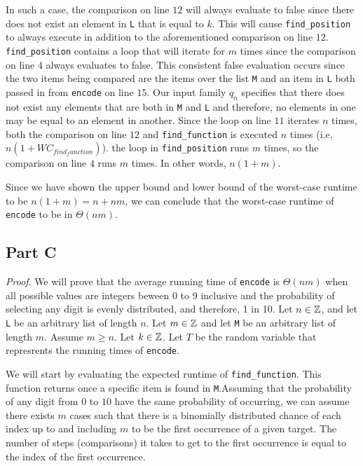 \documentclass{article}
\begin{document}
In such a case, the comparison on line $12$ will always evaluate to false since there does not exist an element in \verb|L| that is equal to $k$. This will cause \verb|find_position| to always execute in addition to the aforementioned comparison on line $12$. \verb|find_position| contains a loop that will iterate for $m$ times since the comparison on line $4$ always evaluates to false. This consistent false evaluation occurs since the two items being compared are the items over the list \verb|M| and an item in \verb|L| both passed in from \verb|encode| on line $15$. Our input family $q_n$ specifies that there does not exist any elements that are both in \verb|M| and \verb|L| and therefore, no elements in one may be equal to an element in another. Since the loop on line $11$ iterates $n$ times, both the comparison on line $12$ and \verb|find_function| is executed $n$ times (i.e, $n(1 + WC_{find_function})$). the loop in \verb|find_position| runs $m$ times, so the comparison on line $4$ runs $m$ times. In other words, $n(1 + m)$.

\medskip

Since we have shown the upper bound and lower bound of the worst-case runtime to be $n(1+m) = n + nm$, we can conclude that the worst-case runtime of \verb|encode| to be in $\Theta(nm)$.


\pagebreak
\subsection*{Part C}

\textit{Proof}. We will prove that the average running time of \verb|encode| is $\Theta(nm)$ when all possible values are integers beween 0 to 9 inclusive and the probability of selecting any digit is evenly distributed, and therefore, 1 in 10. Let $n \in \mathbb Z$, and let \verb|L| be an arbitrary list of length $n$. Let $m \in \mathbb Z$ and let \verb|M| be an arbitrary list of length $m$. Assume $m \geq n$. Let $k \in \mathbb Z$. Let $T$ be the random variable that represrents the running times of \verb|encode|.

\medskip

We will start by evaluating the expected runtime of \verb|find_function|. This function returns once a specific item is found in \verb|M|.Assuming that the probability of any digit from $0$ to $10$ have the same probability of occurring, we can assume there exists $m$ cases such that there is a binomially distributed chance of each index up to and including $m$ to be the first occurrence of a given target. The number of steps (comparisons) it takes to get to the first occurrence is equal to the index of the first occurrence.
\end{document}
